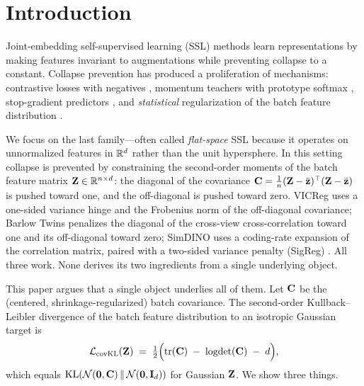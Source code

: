 \section{Introduction}
\label{sec:introduction}

Joint-embedding self-supervised learning (SSL) methods learn representations by making features invariant to augmentations while preventing collapse to a constant. Collapse prevention has produced a proliferation of mechanisms: contrastive losses with negatives \citep{chen2020simclr}, momentum teachers with prototype softmax \citep{caron2021emerging, oquab2023dinov2}, stop-gradient predictors \citep{grill2020byol, chen2021simsiam}, and \emph{statistical} regularization of the batch feature distribution \citep{bardes2022vicreg, zbontar2021barlow, wu2025simdino}.

We focus on the last family---often called \emph{flat-space} SSL because it operates on unnormalized features in $\mathbb{R}^d$ rather than the unit hypersphere. In this setting collapse is prevented by constraining the second-order moments of the batch feature matrix $\mathbf{Z} \in \mathbb{R}^{n \times d}$: the diagonal of the covariance $\mathbf{C} = \tfrac{1}{n}(\mathbf{Z} - \bar{\mathbf{z}})^\top(\mathbf{Z} - \bar{\mathbf{z}})$ is pushed toward one, and the off-diagonal is pushed toward zero. VICReg \citep{bardes2022vicreg} uses a one-sided variance hinge and the Frobenius norm of the off-diagonal covariance; Barlow Twins \citep{zbontar2021barlow} penalizes the diagonal of the cross-view cross-correlation toward one and its off-diagonal toward zero; SimDINO \citep{wu2025simdino} uses a coding-rate expansion \citep{yu2020mcr2, ma2007segmentation} of the correlation matrix, paired with a two-sided variance penalty (SigReg) \citep{schaeffer2024sigreg}. All three work. None derives its two ingredients from a single underlying object.

This paper argues that a single object underlies all of them. Let $\mathbf{C}$ be the (centered, shrinkage-regularized) batch covariance. The second-order Kullback--Leibler divergence of the batch feature distribution to an isotropic Gaussian target is
\begin{equation}
\label{eq:intro_covkl}
    \mathcal{L}_\text{covKL}(\mathbf{Z}) \;=\; \tfrac{1}{2}\Bigl(\operatorname{tr}(\mathbf{C}) \;-\; \operatorname{logdet}(\mathbf{C}) \;-\; d\Bigr),
\end{equation}
which equals $\mathrm{KL}(\mathcal{N}(\mathbf{0}, \mathbf{C}) \,\|\, \mathcal{N}(\mathbf{0}, \mathbf{I}_d))$ for Gaussian $\mathbf{Z}$. We show three things.

